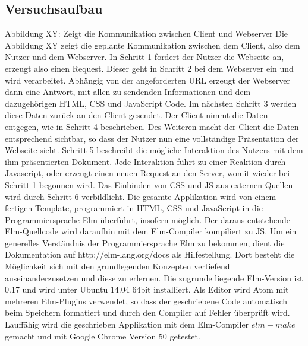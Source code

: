 \subsection{Versuchsaufbau}
\label{sec:Versuchsaufbau}
Abbildung XY: Zeigt die Kommunikation zwischen Client und Webserver
Die Abbildung XY zeigt die geplante Kommunikation zwischen dem Client, also dem Nutzer und dem Webserver.
In Schritt 1 fordert der Nutzer die Webseite an, erzeugt also einen Request. Dieser geht in Schritt 2 bei dem Webserver ein und wird verarbeitet. Abhängig von der angeforderten URL erzeugt der Webserver dann eine Antwort, mit allen zu sendenden Informationen und dem dazugehörigen HTML, CSS und JavaScript Code. Im nächsten Schritt 3 werden diese Daten zurück an den Client gesendet. Der Client nimmt die Daten entgegen, wie in Schritt 4 beschrieben. Des Weiteren macht der Client die Daten entsprechend sichtbar, so dass der Nutzer nun eine vollständige Präsentation der Webseite sieht. Schritt 5 beschreibt die mögliche Interaktion des Nutzers mit dem ihm präsentierten Dokument. Jede Interaktion führt zu einer Reaktion durch Javascript, oder erzeugt einen neuen Request an den Server, womit wieder bei Schritt 1 begonnen wird. Das Einbinden von CSS und JS aus externen Quellen wird durch Schritt 6 verbildlicht.
Die gesamte Applikation wird von einem fertigen Template, programmiert in HTML, CSS und JavaScript in die Programmiersprache Elm überführt, insofern möglich. Der daraus entstehende Elm-Quellcode wird daraufhin mit dem Elm-Compiler kompiliert zu \ac{JS}.
Um ein generelles Verständnis der Programmiersprache Elm zu bekommen, dient die Dokumentation auf http://elm-lang.org/docs als Hilfestellung. Dort besteht die Möglichkeit sich mit den grundlegenden Konzepten vertiefend auseinanderzusetzen und diese zu erlernen.
Die zugrunde liegende Elm-Version ist 0.17 und wird unter Ubuntu 14.04 64bit installiert. Als Editor wird Atom mit mehreren Elm-Plugins verwendet, so dass der geschriebene Code automatisch beim Speichern formatiert und durch den Compiler auf Fehler überprüft wird.
Lauffähig wird die geschrieben Applikation mit dem Elm-Compiler $elm-make$ gemacht und mit Google Chrome Version 50 getestet.
